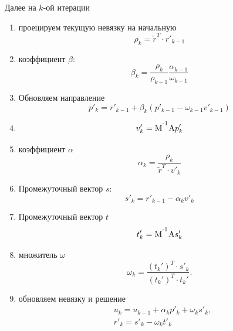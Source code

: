 Далее на $k$-ой итерации

\begin{enumerate}
\item проецируем текущую невязку на начальную
$$\rho_k = \tilde r^T \cdot r'_{k-1}$$
\item коэффициент $\beta$:
$$\beta_k = \frac{\rho_k}{\rho_{k-1}} \frac{\alpha_{k-1}}{\omega_{k-1}}$$
\item Обновляем направление
$$p'_k = r'_{k-1} + \beta_k \left( p'_{k-1} - \omega_{k-1} v'_{k-1} \right)$$
\item
$$v_k'={\rm M}^{\textsuperscript {-1}}{\rm A} p_k'$$
\item коэффициент $\alpha$
$$\alpha_k = \frac{\rho_k}{\tilde r^T \cdot v'_k}$$
\item Промежуточный вектор $s$:
$$s'_k =  r'_{k-1} - \alpha_k v'_k$$
\item Промежуточный вектор $t$
$$t'_k = {\rm M}^{\textsuperscript {-1}}{\rm A}s_k'$$
\item множитель $\omega$
$$\omega_k = \frac{ (t_k')^T \cdot s'_k} { (t_k')^T \cdot t_k' }.$$
\item обновляем невязку и решение
\begin{equation}
\label{eq:schwarz_bicgstab}
\begin{aligned}
& u_k = u_{k-1} + \alpha_k p'_k + \omega_k s'_k, \\
& r'_k = s'_k - \omega_k t'_k
\end{aligned}
\end{equation}
\end{enumerate}

